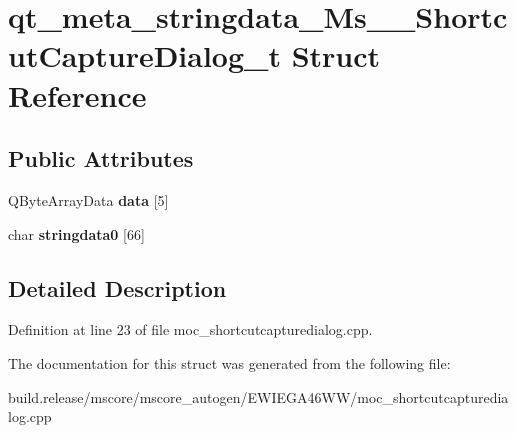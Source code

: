 \hypertarget{structqt__meta__stringdata___ms_____shortcut_capture_dialog__t}{}\section{qt\+\_\+meta\+\_\+stringdata\+\_\+\+Ms\+\_\+\+\_\+\+Shortcut\+Capture\+Dialog\+\_\+t Struct Reference}
\label{structqt__meta__stringdata___ms_____shortcut_capture_dialog__t}
\subsection*{Public Attributes}
\begin{DoxyCompactItemize}
\item 
\mbox{\label{structqt__meta__stringdata___ms_____shortcut_capture_dialog__t_a3b124d1c67fb4b6d52f2997c30750897}} 
Q\+Byte\+Array\+Data {\bfseries data} \mbox{[}5\mbox{]}
\item 
\mbox{\label{structqt__meta__stringdata___ms_____shortcut_capture_dialog__t_a5de38cee501730bcf820aa8f4210f3e4}} 
char {\bfseries stringdata0} \mbox{[}66\mbox{]}
\end{DoxyCompactItemize}


\subsection{Detailed Description}


Definition at line 23 of file moc\+\_\+shortcutcapturedialog.\+cpp.



The documentation for this struct was generated from the following file\+:\begin{DoxyCompactItemize}
\item 
build.\+release/mscore/mscore\+\_\+autogen/\+E\+W\+I\+E\+G\+A46\+W\+W/moc\+\_\+shortcutcapturedialog.\+cpp\end{DoxyCompactItemize}
